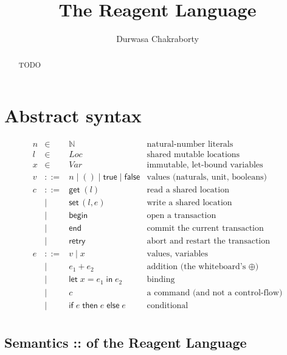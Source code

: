 \documentclass[manuscript,nonacm]{acmart}
\title{The Reagent Language}
\author{Durwasa Chakraborty}
\affiliation{%
  \institution{TODO: institution}
  \country{India}
}
\theoremstyle{acmdefinition}
\newcommand{\Loc}{\mathit{Loc}}
\newcommand{\Var}{\mathit{Var}}
\newcommand{\unit}{()}
\newcommand{\bbegin}{\textsf{begin}}
\newcommand{\eend}{\textsf{end}}
\newcommand{\retry}{\textsf{retry}}
\newcommand{\getc}[1]{\textsf{get}\;(#1)}
\newcommand{\setc}[2]{\textsf{set}\,(#1,#2)}
\begin{document}
\linenumbers
\begin{abstract}
TODO
\end{abstract}

\maketitle

\section{Abstract syntax}

\[
\begin{array}{rcll}
n     & \in & \mathbb{N}        & \text{natural-number literals}\\
l     & \in & \Loc              & \text{shared mutable locations}\\
x     & \in & \Var              & \text{immutable, let-bound variables}\\[4pt]
v     & ::= & n \mid \unit \mid \textsf{true} \mid \textsf{false} & \text{values (naturals, unit, booleans)}\\[4pt]
c     & ::= & \getc{l}          & \text{read a shared location}\\
      & \mid & \setc{l}{e}      & \text{write a shared location}\\
      & \mid & \bbegin          & \text{open a transaction}\\
      & \mid & \eend            & \text{commit the current transaction}\\
      & \mid & \retry           & \text{abort and restart the transaction}\\[4pt]
e     & ::= & v \mid x          & \text{values, variables}\\
      & \mid & e_1 + e_2        & \text{addition (the whiteboard's }\oplus\text{)}\\
      & \mid & \textsf{let}\;x = e_1\;\textsf{in}\;e_2 & \text{binding}\\
      & \mid & c                & \text{a command (and not a control-flow)}\\
      & \mid & \textsf{if}\;e\;\textsf{then}\;e\;\textsf{else}\;e & \text{conditional}\\
\end{array}
\]



\subsection{Semantics :: of the Reagent Language}
\label{subsec:semantics}
\end{document}
